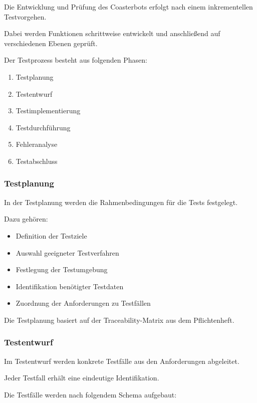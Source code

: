 Die Entwicklung und Prüfung des Coasterbots erfolgt nach einem
inkrementellen Testvorgehen.

Dabei werden Funktionen schrittweise entwickelt und anschließend auf
verschiedenen Ebenen geprüft.

Der Testprozess besteht aus folgenden Phasen:

\begin{enumerate}
\def\labelenumi{\arabic{enumi}.}
\tightlist
\item
  Testplanung
\item
  Testentwurf
\item
  Testimplementierung
\item
  Testdurchführung
\item
  Fehleranalyse
\item
  Testabschluss
\end{enumerate}

\subsubsection{Testplanung}\label{testplanung}

In der Testplanung werden die Rahmenbedingungen für die Tests
festgelegt.

Dazu gehören:

\begin{itemize}
\tightlist
\item
  Definition der Testziele
\item
  Auswahl geeigneter Testverfahren
\item
  Festlegung der Testumgebung
\item
  Identifikation benötigter Testdaten
\item
  Zuordnung der Anforderungen zu Testfällen
\end{itemize}

Die Testplanung basiert auf der Traceability-Matrix aus dem
Pflichtenheft.

\subsubsection{Testentwurf}\label{testentwurf}

Im Testentwurf werden konkrete Testfälle aus den Anforderungen
abgeleitet.

Jeder Testfall erhält eine eindeutige Identifikation.

Die Testfälle werden nach folgendem Schema aufgebaut:

